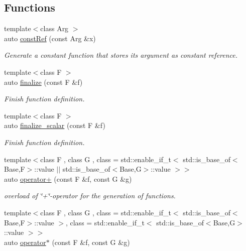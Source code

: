 \subsection*{Functions}
\begin{DoxyCompactItemize}
\item 
{\footnotesize template$<$class Arg $>$ }\\auto \hyperlink{namespaceRFFGen_a1e5703444079774f6e6a9161a9bacc6b}{const\-Ref} (const Arg \&x)
\begin{DoxyCompactList}\small\item\em Generate a constant function that stores its argument as constant reference. \end{DoxyCompactList}\item 
{\footnotesize template$<$class F $>$ }\\auto \hyperlink{namespaceRFFGen_ad0d4bfae5fedad4740c0ab09cb4ff0a1}{finalize} (const F \&f)
\begin{DoxyCompactList}\small\item\em Finish function definition. \end{DoxyCompactList}\item 
{\footnotesize template$<$class F $>$ }\\auto \hyperlink{namespaceRFFGen_a8a6f6d638cd22c164c671c239486bb88}{finalize\-\_\-scalar} (const F \&f)
\begin{DoxyCompactList}\small\item\em Finish function definition. \end{DoxyCompactList}\item 
{\footnotesize template$<$class F , class G , class  = std\-::enable\-\_\-if\-\_\-t$<$ std\-::is\-\_\-base\-\_\-of$<$\-Base,\-F$>$\-::value $\vert$$\vert$                                      std\-::is\-\_\-base\-\_\-of$<$\-Base,\-G$>$\-::value $>$$>$ }\\auto \hyperlink{namespaceRFFGen_a45fcf65f6c783e3da0a0007291f706ca}{operator+} (const F \&f, const G \&g)
\begin{DoxyCompactList}\small\item\em overload of \char`\"{}+\char`\"{}-\/operator for the generation of functions. \end{DoxyCompactList}\item 
{\footnotesize template$<$class F , class G , class  = std\-::enable\-\_\-if\-\_\-t$<$ std\-::is\-\_\-base\-\_\-of$<$\-Base,\-F$>$\-::value $>$, class  = std\-::enable\-\_\-if\-\_\-t$<$ std\-::is\-\_\-base\-\_\-of$<$\-Base,\-G$>$\-::value $>$$>$ }\\auto \hyperlink{namespaceRFFGen_a62822aff0618fe8e869c7f73c82454df}{operator$\ast$} (const F \&f, const G \&g)

\end{DoxyCompactItemize}

